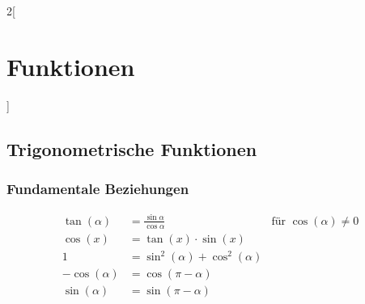\begin{multicols}{2}[
	\section{Funktionen}
]
\subsection{Trigonometrische Funktionen}
	
\subsubsection{Fundamentale Beziehungen}

	\begin{align*}
		\tan(\alpha) &= \frac{\sin \alpha}{\cos \alpha} & \text{für } \cos(\alpha) \neq 0 \\
		\cos(x) &= \tan(x) \cdot \sin(x) \\ %
		 1 &=  \sin^2(\alpha) + \cos^2(\alpha) \\
		 -\cos(\alpha) &= \cos(\pi - \alpha) \\
		 \sin(\alpha) &= \sin(\pi - \alpha)
	\end{align*}
	
	
	
\end{multicols}


